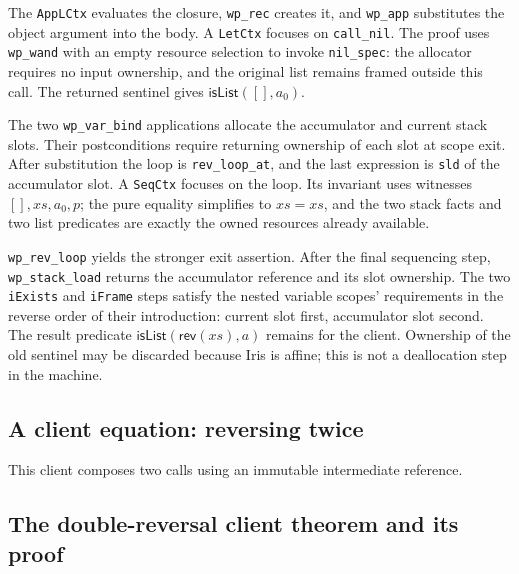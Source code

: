 \documentclass[11pt]{article}
\begin{document}
The \texttt{AppLCtx} evaluates the closure, \texttt{wp\_rec} creates it, and
\texttt{wp\_app} substitutes the object argument into the body. A
\texttt{LetCtx} focuses on \texttt{call\_nil}. The proof uses
\texttt{wp\_wand} with an empty resource selection to invoke \texttt{nil\_spec}:
the allocator requires no input ownership, and the original list remains
framed outside this call. The returned sentinel gives \(\mathsf{isList}([],a_0)\).

The two \texttt{wp\_var\_bind} applications allocate the accumulator and current
stack slots. Their postconditions require returning ownership of each slot at
scope exit. After substitution the loop is \texttt{rev\_loop\_at}, and the last
expression is \texttt{sld} of the accumulator slot. A \texttt{SeqCtx} focuses
on the loop. Its invariant uses witnesses \([],xs,a_0,p\); the pure equality
simplifies to \(xs=xs\), and the two stack facts and two list predicates are
exactly the owned resources already available.

\texttt{wp\_rev\_loop} yields the stronger exit assertion.
After the final sequencing step, \texttt{wp\_stack\_load} returns the accumulator
reference and its slot ownership. The two \texttt{iExists} and \texttt{iFrame}
steps satisfy the nested variable scopes' requirements in the reverse order
of their introduction: current slot first, accumulator slot second.
The result predicate \(\mathsf{isList}(\mathsf{rev}(xs),a)\) remains for the
client. Ownership of the old sentinel may be discarded because Iris is
affine; this is not a deallocation step in the machine.

\subsection{A client equation: reversing twice}

\begin{minipage}{\linewidth}

\end{minipage}

This client composes two calls using an immutable intermediate reference.
\subsection{The double-reversal client theorem and its proof}

\begin{minipage}{\linewidth}

\end{minipage}
\end{document}
